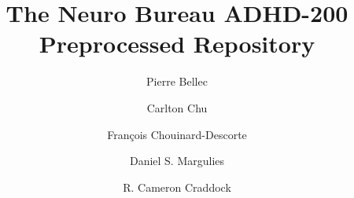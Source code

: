 \documentclass[preprint,12pt,3p]{elsarticle}
\begin{document}
\begin{frontmatter}

\title{The Neuro Bureau ADHD-200 Preprocessed Repository}




\author[label0,label1,label2]{Pierre Bellec}
\address[label0]{The Neuro Bureau}
\address[label1]{Centre de Recherche de l'Institut Universitaire de G\'eriatrie de Montr\'eal, Montr\'eal, CA}
\address[label2]{D\'epartement d'Informatique et de Recherche Op\'erationnelle, Universit\'e de Montr\'eal, Montr\'eal, CA}



\author[label0,label3]{Carlton Chu}
\address[label3]{Google DeepMind, London, UK}

\author[label0,label1,label4]{Fran\c{c}ois Chouinard-Descorte}
\address[label4]{Integrated Program in Neuroscience, McGill University, Montreal, CA}

\author[label0,label5]{Daniel S. Margulies}
\address[label5]{Max Planck Research Group for Neuroanatomy \& Connectivity, Max Planck Institute for Human Cognitive and Brain Sciences, Leipzig, Germany}

\author[label0,lab6,lab7]{R. Cameron Craddock}
\address[lab6]{Computational Neuroimaging Laboratory, Center for Biomedical Imaging and Neuromodulation, Nathan S. Kline Institute for Psychiatric Research, Orangeburg, NY, USA}
\address[lab7]{Center for the Developing Brain, Child Mind Institute, New York, NY, USA}


\end{frontmatter}
\end{document}
